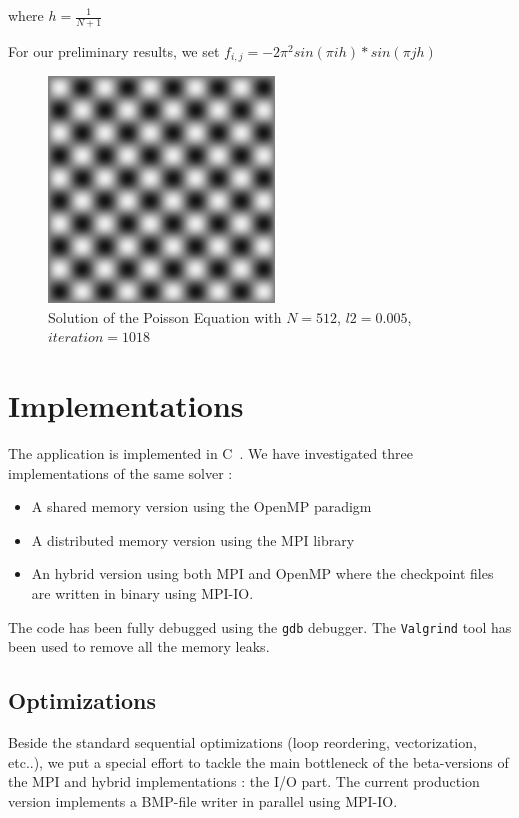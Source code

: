 \documentclass[11pt,a4paper]{article}
\begin{document}
where $h = \frac{1}{N+1}$

For our preliminary results, we set $f_{i,j} = -2 \pi^2 sin(\pi i h) * sin (\pi j h) $

\begin{figure}
\begin{center}
\includegraphics[width=6cm]{poisson.png}
\end{center}
\caption{\label{poissonfigure}Solution of the Poisson Equation with $N=512$, $l2=0.005$, $iteration=1018$}
\end{figure}


\section{Implementations}

The application is implemented in C~\cite{ritchie}. We have investigated three implementations of the same solver :

\begin{itemize}
\item A shared memory version using the OpenMP paradigm~\cite{openmp}
\item A distributed memory version using the MPI library~\cite{mpi}
\item An hybrid version using both MPI and OpenMP where the checkpoint files are written in binary using MPI-IO.
\end{itemize}

The code has been fully debugged using the \texttt{gdb} debugger. The \texttt{Valgrind} tool has been used to remove all the memory leaks. 

\subsection{Optimizations}

Beside the standard sequential optimizations (loop reordering, vectorization, etc..), we put a special effort to tackle the main bottleneck of the beta-versions of the MPI and hybrid implementations : the I/O part. The current production version implements a BMP-file writer in parallel using MPI-IO. 
\end{document}
